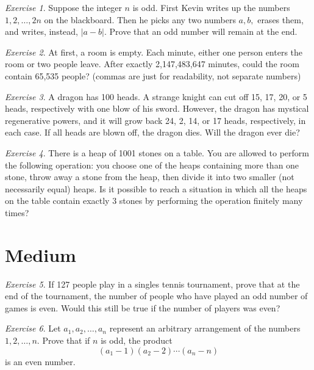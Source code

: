 \documentclass{article}
\theoremstyle{definition}
\theoremstyle{remark}
\newtheorem{exercise}{Exercise}
\begin{document}
    \begin{exercise}
        Suppose the integer \(n\) is odd. First Kevin writes up the numbers \(1, 2, \ldots, 2n\) on the blackboard. Then he picks any two numbers \(a, b,\) erases them, and writes, instead, \(|a-b|\). Prove that an odd number will remain at the end.
    \end{exercise}

    \begin{exercise}
        At first, a room is empty. Each minute, either one person enters the room or two people leave. After exactly 2,147,483,647 minutes, could the room contain 65,535 people? (commas are just for readability, not separate numbers)
    \end{exercise}

    \begin{exercise}
        A dragon has 100 heads. A strange knight can cut off 15, 17, 20, or 5 heads, respectively with one blow of his sword. However, the dragon has mystical regenerative powers, and it will grow back 24, 2, 14, or 17 heads, respectively, in each case. If all heads are blown off, the dragon dies. Will the dragon ever die?
    \end{exercise}

    \begin{exercise}
        There is a heap of 1001 stones on a table. You are allowed to perform the following operation: you choose one of the heaps containing more than one stone, throw away a stone from the heap, then divide it into two smaller (not necessarily equal) heaps. Is it possible to reach a situation in which all the heaps on the table contain exactly 3 stones by performing the operation finitely many times?
    \end{exercise}

\section{Medium}

    \begin{exercise}
        If 127 people play in a singles tennis tournament, prove that at the end of the tournament, the number of people who have played an odd number of games is even. Would this still be true if the number of players was even?
    \end{exercise}

    \begin{exercise}
        Let \(a_1,a_2,\ldots,a_n\) represent an arbitrary arrangement of the numbers \(1,2,\ldots,n\). Prove that if \(n\) is odd, the product
        \[(a_1-1)(a_2-2)\cdots(a_n-n)\]
        is an even number.
    \end{exercise}
\end{document}
